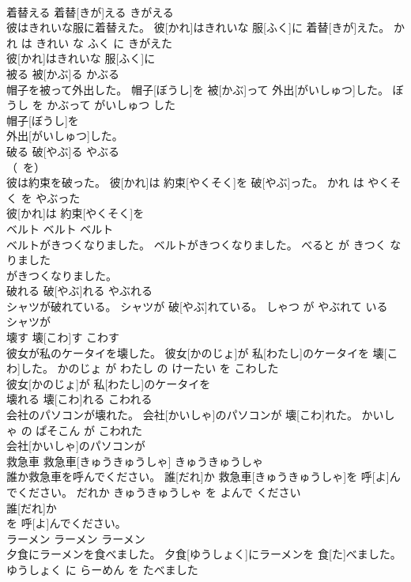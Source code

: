 \documentclass[8pt]{extreport}
\begin{document}
\begin{CJK}{UTF8}{min}
\\	着替える	着替[きが]える	きがえる	
\\	彼はきれいな服に着替えた。	彼[かれ]はきれいな 服[ふく]に 着替[きが]えた。	かれ は きれい な ふく に きがえた	
\\	彼[かれ]はきれいな 服[ふく]に
\\	被る	被[かぶ]る	かぶる	
\\	帽子を被って外出した。	帽子[ぼうし]を 被[かぶ]って 外出[がいしゅつ]した。	ぼうし を かぶって がいしゅつ した	
\\	帽子[ぼうし]を
\\	外出[がいしゅつ]した。		
\\	破る	破[やぶ]る	やぶる	
\\	（~を）		
\\	彼は約束を破った。	彼[かれ]は 約束[やくそく]を 破[やぶ]った。	かれ は やくそく を やぶった	
\\	彼[かれ]は 約束[やくそく]を
\\	ベルト	ベルト	ベルト	
\\	ベルトがきつくなりました。	ベルトがきつくなりました。	べると が きつく なりました	
\\	がきつくなりました。		
\\	破れる	破[やぶ]れる	やぶれる	
\\	シャツが破れている。	シャツが 破[やぶ]れている。	しゃつ が やぶれて いる	
\\	シャツが
\\	壊す	壊[こわ]す	こわす	
\\	彼女が私のケータイを壊した。	彼女[かのじょ]が 私[わたし]のケータイを 壊[こわ]した。	かのじょ が わたし の けーたい を こわした	
\\	彼女[かのじょ]が 私[わたし]のケータイを
\\	壊れる	壊[こわ]れる	こわれる	
\\	会社のパソコンが壊れた。	会社[かいしゃ]のパソコンが 壊[こわ]れた。	かいしゃ の ぱそこん が こわれた	
\\	会社[かいしゃ]のパソコンが
\\	救急車	救急車[きゅうきゅうしゃ]	きゅうきゅうしゃ	
\\	誰か救急車を呼んでください。	誰[だれ]か 救急車[きゅうきゅうしゃ]を 呼[よ]んでください。	だれか きゅうきゅうしゃ を よんで ください	
\\	誰[だれ]か
\\	を 呼[よ]んでください。		
\\	ラーメン	ラーメン	ラーメン	
\\	夕食にラーメンを食べました。	夕食[ゆうしょく]にラーメンを 食[た]べました。	ゆうしょく に らーめん を たべました	

\end{CJK}
\end{document}
